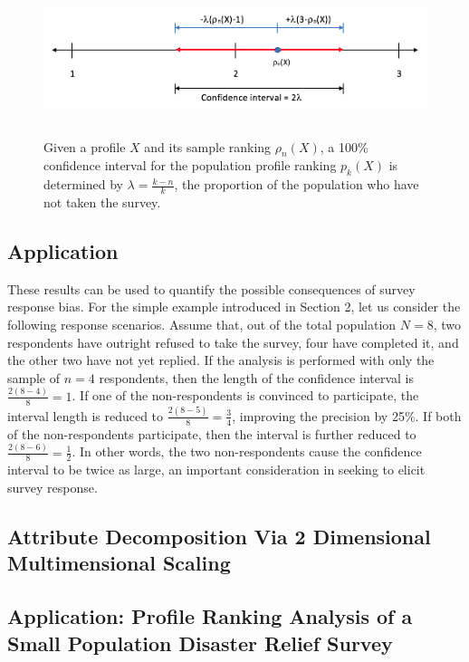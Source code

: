 \documentclass[a4paper, 12pt]{article}
\begin{document}
\begin{figure}[!htpb]
\centering
\includegraphics[width=6.5in, height=1.75in]{Confidence_Interval.png}
\caption{Given a profile $X$ and its sample ranking $\rho_n(X)$, a 100\% confidence interval for the population profile ranking $p_k(X)$ is determined by $\lambda=\frac{k-n}{k}$, the proportion of the population who have not taken the survey.}
\label{AL}
\end{figure}


\subsection{Application}

These results can be used to quantify the possible consequences of survey response bias. For the simple example introduced in Section 2, let us consider the following response scenarios. Assume that, out of the total population $N=8$, two respondents have outright refused to take the survey, four have completed it, and the other two have not yet replied. If the analysis is performed with only the sample of $n=4$ respondents, then the length of the confidence interval is  $\frac{2(8-4)}{8}=1$. If one of the non-respondents is convinced to participate, the interval length is reduced to $\frac{2(8-5)}{8}=\frac{3}{4}$, improving the precision by 25\%. If both of the non-respondents participate, then the interval is further reduced to $\frac{2(8-6)}{8}=\frac{1}{2}$. In other words, the two non-respondents  cause the confidence interval to be twice as large, an important consideration in seeking to elicit survey response.

\subsection{Attribute Decomposition Via 2 Dimensional Multimensional Scaling}
\subsection{Application: Profile Ranking Analysis of a Small Population Disaster Relief Survey}
\end{document}

